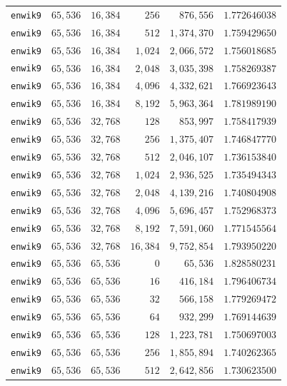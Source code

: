 \begin{longtable}{lrrrrr}
\texttt{enwik9} & $65{,}536$ & $16{,}384$ & $256$ & $876{,}556$ & $1.772646038$ \\
\texttt{enwik9} & $65{,}536$ & $16{,}384$ & $512$ & $1{,}374{,}370$ & $1.759429650$ \\
\texttt{enwik9} & $65{,}536$ & $16{,}384$ & $1{,}024$ & $2{,}066{,}572$ & $1.756018685$ \\
\texttt{enwik9} & $65{,}536$ & $16{,}384$ & $2{,}048$ & $3{,}035{,}398$ & $1.758269387$ \\
\texttt{enwik9} & $65{,}536$ & $16{,}384$ & $4{,}096$ & $4{,}332{,}621$ & $1.766923643$ \\
\texttt{enwik9} & $65{,}536$ & $16{,}384$ & $8{,}192$ & $5{,}963{,}364$ & $1.781989190$ \\
\texttt{enwik9} & $65{,}536$ & $32{,}768$ & $128$ & $853{,}997$ & $1.758417939$ \\
\texttt{enwik9} & $65{,}536$ & $32{,}768$ & $256$ & $1{,}375{,}407$ & $1.746847770$ \\
\texttt{enwik9} & $65{,}536$ & $32{,}768$ & $512$ & $2{,}046{,}107$ & $1.736153840$ \\
\texttt{enwik9} & $65{,}536$ & $32{,}768$ & $1{,}024$ & $2{,}936{,}525$ & $1.735494343$ \\
\texttt{enwik9} & $65{,}536$ & $32{,}768$ & $2{,}048$ & $4{,}139{,}216$ & $1.740804908$ \\
\texttt{enwik9} & $65{,}536$ & $32{,}768$ & $4{,}096$ & $5{,}696{,}457$ & $1.752968373$ \\
\texttt{enwik9} & $65{,}536$ & $32{,}768$ & $8{,}192$ & $7{,}591{,}060$ & $1.771545564$ \\
\texttt{enwik9} & $65{,}536$ & $32{,}768$ & $16{,}384$ & $9{,}752{,}854$ & $1.793950220$ \\
\texttt{enwik9} & $65{,}536$ & $65{,}536$ & $0$ & $65{,}536$ & $1.828580231$ \\
\texttt{enwik9} & $65{,}536$ & $65{,}536$ & $16$ & $416{,}184$ & $1.796406734$ \\
\texttt{enwik9} & $65{,}536$ & $65{,}536$ & $32$ & $566{,}158$ & $1.779269472$ \\
\texttt{enwik9} & $65{,}536$ & $65{,}536$ & $64$ & $932{,}299$ & $1.769144639$ \\
\texttt{enwik9} & $65{,}536$ & $65{,}536$ & $128$ & $1{,}223{,}781$ & $1.750697003$ \\
\texttt{enwik9} & $65{,}536$ & $65{,}536$ & $256$ & $1{,}855{,}894$ & $1.740262365$ \\
\texttt{enwik9} & $65{,}536$ & $65{,}536$ & $512$ & $2{,}642{,}856$ & $1.730623500$ \\

\end{longtable}
